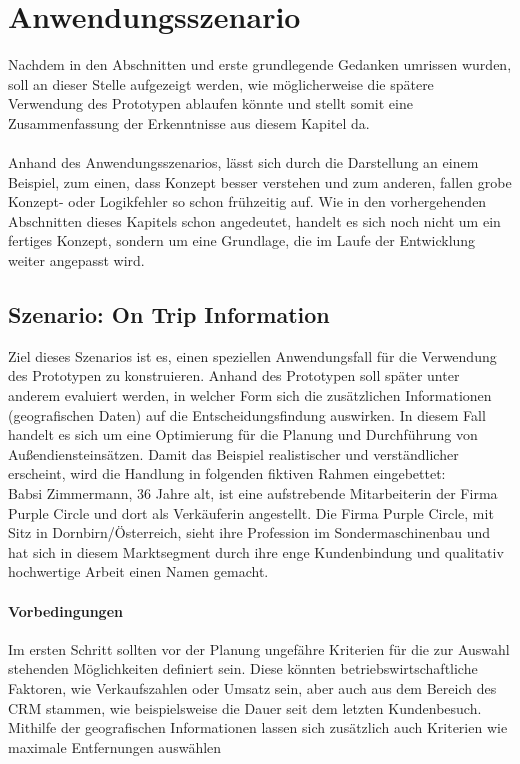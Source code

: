 \documentclass[Bachelorarbeit.tex]{subfiles}
\begin{document}
\section{Anwendungsszenario}
\label{sec:anwendungsszenario}
Nachdem in den Abschnitten  und  erste grundlegende Gedanken umrissen wurden, soll an dieser Stelle aufgezeigt werden, wie möglicherweise die spätere Verwendung des Prototypen ablaufen könnte und stellt somit eine Zusammenfassung der Erkenntnisse aus diesem Kapitel da.\\
\\
Anhand des Anwendungsszenarios, lässt sich durch die Darstellung an einem Beispiel, zum einen, dass Konzept besser verstehen und zum anderen, fallen grobe Konzept- oder Logikfehler so schon frühzeitig auf.
Wie in den vorhergehenden Abschnitten dieses Kapitels schon angedeutet, handelt es sich noch nicht um ein fertiges Konzept, sondern um eine Grundlage, die im Laufe der Entwicklung weiter angepasst wird.

\subsection{Szenario: On Trip Information }
Ziel dieses Szenarios ist es, einen speziellen Anwendungsfall für die Verwendung des Prototypen zu konstruieren. 
Anhand des Prototypen soll später unter anderem evaluiert werden, in welcher Form sich die zusätzlichen Informationen (geografischen Daten) auf die Entscheidungsfindung auswirken.
In diesem Fall handelt es sich um eine Optimierung für die Planung und Durchführung von Außendiensteinsätzen.
Damit das Beispiel realistischer und verständlicher erscheint, wird die Handlung in folgenden fiktiven Rahmen eingebettet:\\

Babsi Zimmermann, 36 Jahre alt, ist eine aufstrebende Mitarbeiterin der Firma Purple Circle und dort als Verkäuferin angestellt. 
Die Firma Purple Circle, mit Sitz in Dornbirn/Österreich, sieht ihre Profession im Sondermaschinenbau und hat sich in diesem Marktsegment durch ihre enge Kundenbindung und qualitativ hochwertige Arbeit einen Namen gemacht. 


\paragraph*{Vorbedingungen}
Im ersten Schritt sollten vor der Planung ungefähre Kriterien für die zur Auswahl stehenden Möglichkeiten definiert sein.
Diese könnten betriebswirtschaftliche Faktoren, wie Verkaufszahlen oder Umsatz sein, aber auch aus dem Bereich des \ac{CRM} stammen, wie beispielsweise die Dauer seit dem letzten Kundenbesuch.
Mithilfe der geografischen Informationen lassen sich zusätzlich auch Kriterien wie maximale Entfernungen auswählen
\end{document}
